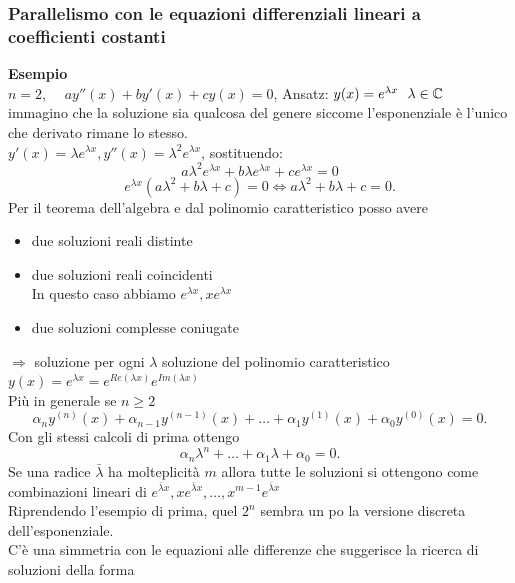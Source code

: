 \documentclass[12px]{article}
\begin{document}
\subsubsection{Parallelismo con le equazioni differenziali lineari a coefficienti costanti}
\textbf{Esempio}\\
$n=2$, \ \  $ay''(x) + by'(x) + cy(x) =0$, Ansatz:  $y(x) = e^{\lambda x} \ \ \lambda\in \mathbb{C}$\\
immagino che la soluzione sia qualcosa del genere siccome l'esponenziale è l'unico che derivato rimane lo stesso.\\
$y'(x) = \lambda e^{\lambda x}, y''(x) = \lambda^2 e^{\lambda x}$, sostituendo:
 \[
	 a\lambda^2 e^{\lambda x} + b \lambda e^{\lambda x} + c e^{\lambda x} = 0
\] 
\[
e^{\lambda x} (a\lambda^2 + b\lambda + c) = 0 \Leftrightarrow a \lambda^2 + b \lambda + c =0
.\] 
Per il teorema dell'algebra e dal polinomio caratteristico posso avere 
\begin{itemize}
	\item due soluzioni reali distinte
	\item due soluzioni reali coincidenti\\
		In questo caso abbiamo
		$e^{\lambda x}, x e^{\lambda x}$
		\item due soluzioni complesse coniugate
\end{itemize}
$ \Rightarrow $ soluzione per ogni $\lambda$ soluzione del polinomio caratteristico \\
$y(x) = e^{\lambda x} = e^{Re(\lambda x)}e^{Im(\lambda x)}$\\
Più in generale se $n\geq 2$
 \[
	 \alpha_n y^{(n)}(x) + \alpha_{n-1}y^{(n-1)}(x) + \ldots + \alpha_1y^{(1)}(x) + \alpha_0y^{(0)}(x) = 0
.\] 
Con gli stessi calcoli di prima ottengo
\[
\alpha_n\lambda^n + \ldots + \alpha_1\lambda + \alpha_0 =0 
.\]
Se una radice $\bar \lambda$ ha molteplicità  $m$ allora tutte le soluzioni si ottengono come combinazioni lineari di $e^{\bar\lambda x}, x e^{\bar \lambda x},\ldots,x^{m-1}e^{\bar\lambda x}$\\
Riprendendo l'esempio di prima, quel $2^n$ sembra un po la versione discreta dell'esponenziale.\\
C'è una simmetria con le equazioni alle differenze che suggerisce la ricerca di soluzioni della forma
\end{document}
